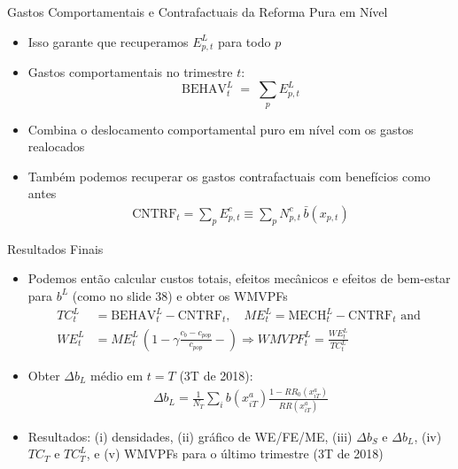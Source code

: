 \begin{frame}{Gastos Comportamentais e Contrafactuais da Reforma Pura em Nível}
    \begin{itemize}
        \item {Isso garante que recuperamos $E^{L}_{p,t}$ para todo $p$}
        
        \item Gastos comportamentais no trimestre $t$:
        \[
            {
            \text{BEHAV}^{L}_t
            \;=\;
            \sum_{p}
            E^{L}_{p,t}
            }
        \]
        
        \item {Combina o deslocamento comportamental puro em nível com os gastos realocados}
        
        \item Também podemos recuperar os gastos contrafactuais com benefícios como antes
        \begin{align*}
            {
            \text{CNTRF}_t
            =
            \sum_{p}
            E^{c}_{p,t}
            }\equiv \sum_{p}
            N^{c}_{p,t}\,
            \bar b(x_{p,t})
        \end{align*}
    \end{itemize}
\end{frame}



\begin{frame}{Resultados Finais}
    \begin{itemize}
        \item Podemos então calcular custos totais, efeitos mecânicos e efeitos de bem-estar para $b^L$ (como no slide 38) e obter os WMVPFs
        \begin{align*}
             TC^L_t &= \text{BEHAV}_t^{L} - \text{CNTRF}_t, \quad 
             ME^L_t = \text{MECH}_t^{L} - \text{CNTRF}_t \text{ and }\\ 
            WE^L_t &= ME^L_t \, \left(1-\gamma \frac{c_b - c_{pop}}{c_{pop}}-\right) \Rightarrow WMVPF_t^L = \frac{WE^L_t}{TC^L_t}
        \end{align*}
        
        \item Obter $\Delta b_L$ médio em $t=T$ (3T de 2018):
        \begin{align*}
            \Delta b_L = \frac{1}{N_T}\sum_{i}b(x^a_{iT})\frac{1-RR_{0}(x^a_{iT})}{RR(x^a_{iT})}
        \end{align*}
        
        \item Resultados: (i) densidades, (ii) gráfico de WE/FE/ME, (iii) $\Delta b_S$ e $\Delta b_L$, (iv) $TC_T$ e $TC_T^L$, e (v) WMVPFs para o último trimestre (3T de 2018)
    \end{itemize}
\end{frame}

